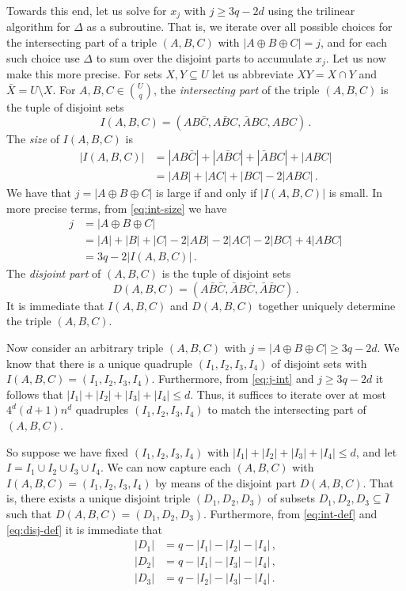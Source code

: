 \documentclass{amsart}
\begin{document}
Towards this end, 
let us solve for $x_{j}$ with $j\geq 3q-2d$ using the trilinear algorithm 
for $\Delta$ as a subroutine. 
That is, we iterate over all possible choices
for the intersecting part of a triple $(A,B,C)$ with $|A\oplus B\oplus C|=j$,
and for each such choice use $\Delta$ to sum over the disjoint parts 
to accumulate $x_j$.
Let us now make this more precise.
For sets $X,Y\subseteq U$ let us abbreviate $XY=X\cap Y$ and
$\bar X=U\setminus X$. 
For $A,B,C\in\binom{U}{q}$, the {\em intersecting part}
of the triple $(A,B,C)$ is the tuple
of disjoint sets 
\begin{equation}
\label{eq:int-def}
I(A,B,C)=(AB\bar C,A\bar BC,\bar ABC,ABC)\,.
\end{equation}
The {\em size} of $I(A,B,C)$ is 
\begin{equation}
\label{eq:int-size}
\begin{split}
|I(A,B,C)|&=
|AB\bar C|
+|A\bar BC|
+|\bar ABC|
+|ABC|\\
&=|AB|+|AC|+|BC|-2|ABC|\,.
\end{split}
\end{equation}
We have that $j=|A\oplus B\oplus C|$ is large if and only if 
$|I(A,B,C)|$ is small. In more precise terms, from \eqref{eq:int-size}
we have
\begin{equation}
\label{eq:j-int}
\begin{split}
j&=|A\oplus B\oplus C|\\
&=|A|+|B|+|C|
-2|AB|-2|AC|-2|BC|
+4|ABC|\\
&=3q-2|I(A,B,C)|\,.
\end{split}
\end{equation}
The {\em disjoint part} of $(A,B,C)$ is the tuple 
of disjoint sets
\begin{equation}
\label{eq:disj-def}
D(A,B,C)=(A\bar B\bar C,\bar AB\bar C,\bar A\bar BC)\,.
\end{equation}
It is immediate that $I(A,B,C)$ and $D(A,B,C)$ together
uniquely determine the triple $(A,B,C)$.

Now consider an arbitrary triple $(A,B,C)$ with 
$j=|A\oplus B\oplus C|\geq 3q-2d$. We know that there is a 
unique quadruple $(I_1,I_2,I_3,I_4)$ of disjoint sets 
with $I(A,B,C)=(I_1,I_2,I_3,I_4)$. Furthermore, from \eqref{eq:j-int}
and $j\geq 3q-2d$ it follows that $|I_1|+|I_2|+|I_3|+|I_4|\leq d$.
Thus, it suffices to iterate over at most $4^d(d+1)n^{d}$ quadruples 
$(I_1,I_2,I_3,I_4)$ to match the intersecting part of $(A,B,C)$.

So suppose we have fixed $(I_1,I_2,I_3,I_4)$ with 
$|I_1|+|I_2|+|I_3|+|I_4|\leq d$, and let $I=I_1\cup I_2\cup I_3\cup I_4$.
We can now capture each $(A,B,C)$ with $I(A,B,C)=(I_1,I_2,I_3,I_4)$ 
by means of the disjoint part $D(A,B,C)$. That is, there exists a unique 
disjoint triple $(D_1,D_2,D_3)$ of subsets $D_1,D_2,D_3\subseteq\bar I$ 
such that $D(A,B,C)=(D_1,D_2,D_3)$.
Furthermore, from \eqref{eq:int-def} and \eqref{eq:disj-def} it is 
immediate that
\[
\begin{split}
|D_1|&=q-|I_1|-|I_2|-|I_4|\,,\\
|D_2|&=q-|I_1|-|I_3|-|I_4|\,,\\
|D_3|&=q-|I_2|-|I_3|-|I_4|\,.
\end{split}
\]
\end{document}
